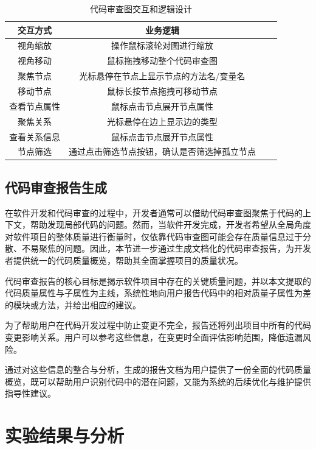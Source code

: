 \begin{table}[htbp]
\caption{代码审查图交互和逻辑设计}
\vspace{0.5em}\centering\wuhao
\begin{tabular}{cccc}
\toprule
交互方式 & 业务逻辑 \\
\midrule
视角缩放 & 操作鼠标滚轮对图进行缩放  \\
视角移动 & 鼠标拖拽移动整个代码审查图   \\
聚焦节点 & 光标悬停在节点上显示节点的方法名/变量名  \\
移动节点 & 鼠标长按节点拖拽可移动节点 \\
查看节点属性 & 鼠标点击节点展开节点属性  \\
聚焦关系 & 光标悬停在边上显示边的类型  \\
查看关系信息 & 鼠标点击节点展开节点属性  \\
节点筛选 & 通过点击筛选节点按钮，确认是否筛选掉孤立节点 \\
\bottomrule
\end{tabular}
\end{table}



\subsection{代码审查报告生成}

在软件开发和代码审查的过程中，开发者通常可以借助代码审查图聚焦于代码的上下文，帮助发现局部代码的问题。然而，当软件开发完成，开发者希望从全局角度对软件项目的整体质量进行衡量时，仅依靠代码审查图可能会存在质量信息过于分散、不易聚焦的问题。因此，本节进一步通过生成文档化的代码审查报告，为开发者提供统一的代码质量概览，帮助其全面掌握项目的质量状况。

代码审查报告的核心目标是揭示软件项目中存在的关键质量问题，并以本文提取的代码质量属性与子属性为主线，系统性地向用户报告代码中的相对质量子属性为差的模块或方法，并给出相应的建议。

为了帮助用户在代码开发过程中防止变更不完全，报告还将列出项目中所有的代码变更影响关系。用户可以参考这些信息，在变更时全面评估影响范围，降低遗漏风险。

通过对这些信息的整合与分析，生成的报告文档为用户提供了一份全面的代码质量概览，既可以帮助用户识别代码中的潜在问题，又能为系统的后续优化与维护提供指导性建议。

\section{实验结果与分析}

